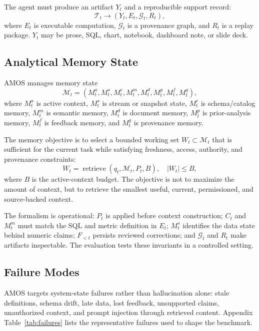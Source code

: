 \documentclass[sigconf,nonacm]{acmart}
\newcommand{\amos}{\textsc{AMOS}\xspace}
\newcommand{\mem}{\mathcal{M}}
\newcommand{\task}{\mathcal{T}}
\newcommand{\prov}{\mathcal{G}}
\begin{document}
The agent must produce an artifact $Y_t$ and a reproducible support record:
\begin{equation}
    \task_t \rightarrow (Y_t, E_t, \prov_t, R_t),
\end{equation}
where $E_t$ is executable computation, $\prov_t$ is a provenance graph, and $R_t$ is a replay package. $Y_t$ may be prose, SQL, chart, notebook, dashboard note, or slide deck.

\subsection{Analytical Memory State}
\amos manages memory state
\begin{equation}
\mem_t = (M^a_t, M^s_t, M^c_t, M^m_t, M^d_t, M^p_t, M^f_t, M^g_t),
\end{equation}
where $M^a_t$ is active context, $M^s_t$ is stream or snapshot state, $M^c_t$ is schema/catalog memory, $M^m_t$ is semantic memory, $M^d_t$ is document memory, $M^p_t$ is prior-analysis memory, $M^f_t$ is feedback memory, and $M^g_t$ is provenance memory.

The memory objective is to select a bounded working set $W_t \subset \mem_t$ that is sufficient for the current task while satisfying freshness, access, authority, and provenance constraints:
\begin{equation}
    W_t = \operatorname{retrieve}(q_t, \mem_t, P_t, B), \quad |W_t| \le B,
\end{equation}
where $B$ is the active-context budget. The objective is not to maximize the amount of context, but to retrieve the smallest useful, current, permissioned, and source-backed context.

The formalism is operational: $P_t$ is applied before context construction; $C_t$ and $M^m_t$ must match the SQL and metric definition in $E_t$; $M^s_t$ identifies the data state behind numeric claims; $F_{<t}$ persists reviewed corrections; and $\prov_t$ and $R_t$ make artifacts inspectable. The evaluation tests these invariants in a controlled setting.

\subsection{Failure Modes}
\amos targets system-state failures rather than hallucination alone: stale definitions, schema drift, late data, lost feedback, unsupported claims, unauthorized context, and prompt injection through retrieved content. Appendix Table~\ref{tab:failures} lists the representative failures used to shape the benchmark.
\end{document}
